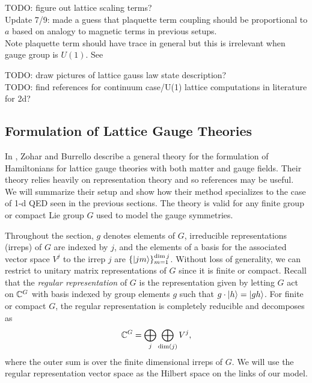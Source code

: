\documentclass[10pt,reqno]{amsart}
\begin{document}
	TODO: figure out lattice scaling terms? \\
	\qquad Update 7/9: made a guess that plaquette term coupling should be proportional to $a$ based on analogy to magnetic terms in previous setups.\\
	Note plaquette term should have trace in general but this is irrelevant when gauge group is $U(1)$. See \cite{ZoharBurrello15}
	
	
	TODO: draw pictures of lattice gauss law state description?\\
	
	TODO: find references for continuum case/U(1) lattice computations in literature for 2d?
	
	\subsection{Formulation of Lattice Gauge Theories}
	
	In \cite{ZoharBurrello15}, Zohar and Burrello describe a general theory for the formulation of Hamiltonians for lattice gauge theories with both matter and gauge fields. 
	Their theory relies heavily on representation theory and so references \cite{hall_lglarep,teleman_rep_theory} may be useful.
	We will summarize their setup and show how their method specializes to the case of 1-d QED seen in the previous sections.
	The theory is valid for any finite group or compact Lie group $G$ used to model the gauge symmetries.
	
	Throughout the section, $g$ denotes elements of $G$, irreducible representations (irreps) of $G$ are indexed by $j$, and the elements of a basis for the associated vector space $V^j$ to the irrep $j$ are $\{\ket{jm} \}_{m=1}^{\dim j}$.
	Without loss of generality, we can restrict to unitary matrix representations of $G$ since it is finite or compact.
	Recall that the \emph{regular representation} of $G$ is the representation given by letting $G$ act on $\mathbb{C}^{G}$ with basis indexed by group elements $g$ such that $g\cdot \ket{h} = \ket{gh}$.
	For finite or compact $G$, the regular representation is completely reducible and decomposes as
	\begin{equation}
		\mathbb{C}^{G}=\bigoplus_j \bigoplus_{\dim (j)} V^j,
	\end{equation}
	where the outer sum is over the finite dimensional irreps of $G$.
	We will use the regular representation vector space as the Hilbert space on the links of our model.
	
\end{document}
